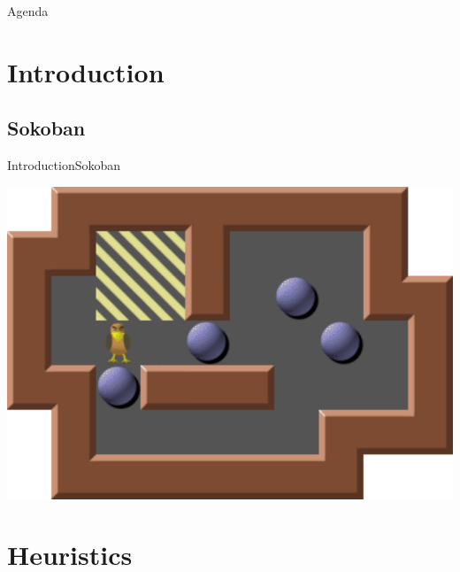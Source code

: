 
\begin{frame}[t,plain]
\titlepage
\end{frame}

\begin{frame}{Agenda}
\tableofcontents
\end{frame}



\section{Introduction}
\subsection{Sokoban}


\begin{frame}{Introduction}{Sokoban}
  \begin{center}
    \includegraphics[height=0.7\textheight]{level.pdf}
  \end{center}
\end{frame}


\section{Heuristics}
